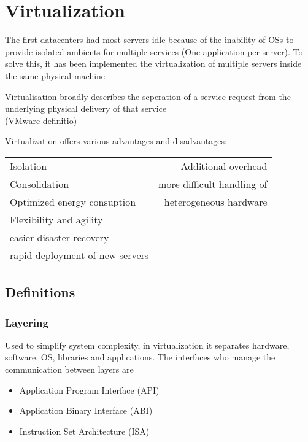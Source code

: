 \documentclass[12pt, a4paper]{article}
\begin{document}


\newpage
\section{Virtualization}
The first datacenters had most servers idle because of the inability of OSs to provide isolated ambients for 
multiple services (One application per server). To solve this, it has been implemented the virtualization of multiple 
servers inside the same physical machine

\begin{center}
    Virtualisation broadly describes the seperation of a service request from the underlying physical delivery of
    that service\\(VMware definitio)
\end{center}

Virtualization offers various advantages and disadvantages:
\begin{center}
    \begin{tabular}{l | r}
        Isolation & Additional overhead \\
        Consolidation & more difficult handling of \\
        Optimized energy consuption & heterogeneous hardware\\
        Flexibility and agility& \\
        easier disaster recovery& \\
        rapid deployment of new servers& 
    \end{tabular}
\end{center}

\subsection{Definitions}

\subsubsection{Layering}
Used to simplify system complexity, in virtualization it separates hardware, software, OS, libraries and 
applications. The interfaces who manage the communication between layers are
\begin{itemize}
    \item Application Program Interface (API)
    \subitem %
    \item Application Binary Interface (ABI)
    \subitem %
    \item Instruction Set Architecture (ISA)
    \subitem %
\end{itemize}
\end{document}
